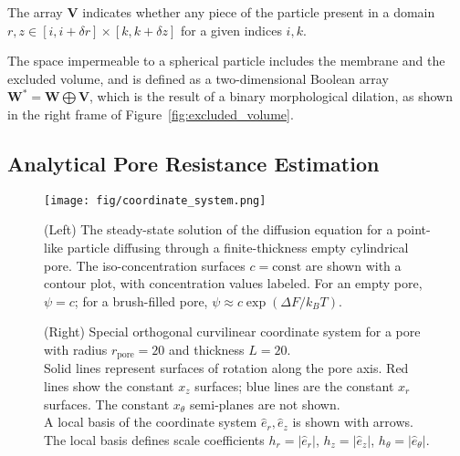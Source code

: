 \documentclass[10pt, a4paper]{article}
\begin{document}
\begin{multicols}{2}
The array $\bm{V}$ indicates whether any piece of the particle present in a domain $r,z \in [i, i + \delta r] \times [k, k + \delta z]$ for a given indices $i,k$.

The space impermeable to a spherical particle includes the membrane and the excluded volume, and is defined as a two-dimensional Boolean array $\bm{W}^{\ast} = \bm{W} \bigoplus \bm{V}$, which is the result of a binary morphological dilation, as shown in the right frame of Figure~\ref{fig:excluded_volume}.

\end{multicols}


\subsection*{Analytical Pore Resistance Estimation}

\begin{figure*}[]
    \centering
    \texttt{[image: fig/coordinate\_system.png]}
    \caption{
        (Left)
        The steady-state solution of the diffusion equation for a point-like particle diffusing through a finite-thickness empty cylindrical pore.
        The iso-concentration surfaces $c = \textrm{const}$ are shown with a contour plot, with concentration values labeled.
        For an empty pore, $\psi = c$; for a brush-filled pore, $\psi \approx c \exp(\Delta F / k_B T)$.
    }
    \label{fig:empty_pore_solution}
    \caption{
        (Right)
        Special orthogonal curvilinear coordinate system for a pore with radius $r_{\textrm{pore}} = 20$ and thickness $L = 20$.
        \\
        Solid lines represent surfaces of rotation along the pore axis.
        Red lines show the constant $x_{z}$ surfaces; blue lines are the constant $x_{r}$ surfaces.
        The constant $x_{\theta}$ semi-planes are not shown.
        \\
        A local basis of the coordinate system $\hat{e}_r, \hat{e}_z$ is shown with arrows.
        The local basis defines scale coefficients $h_r = |\hat{e}_r|$, $h_z = |\hat{e}_z|$, $h_{\theta} = |\hat{e}_{\theta}|$.
        }
    \label{fig:coordinate_system}
\end{figure*}
\end{document}

